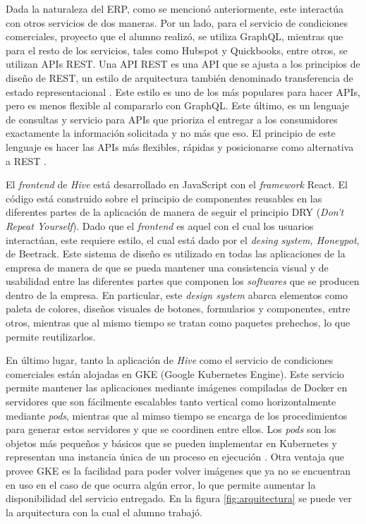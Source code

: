    Dada la naturaleza del ERP, como se mencionó anteriormente, este interactúa con otros servicios de dos maneras. Por un lado, para el servicio de condiciones comerciales, proyecto que el alumno realizó, se utiliza GraphQL, mientras que para el resto de los servicios, tales como Hubspot y Quickbooks, entre otros, se utilizan APIs REST. Una API REST es una API que se ajusta a los principios de diseño de REST, un estilo de arquitectura también denominado transferencia de estado representacional \cite{ibm_api_rest}. Este estilo es uno de los más populares para hacer APIs, pero es menos flexible al compararlo con GraphQL. Este último, es un lenguaje de consultas y servicio para APIs que prioriza el entregar a los consumidores exactamente la información solicitada y no más que eso. El principio de este lenguaje es hacer las APIs más flexibles, rápidas y posicionarse como alternativa a REST \cite{def_graphql}.
   
   El \textit{frontend} de \textit{Hive} está desarrollado en JavaScript con el \textit{framework} React. El código está construido sobre el principio de componentes reusables en las diferentes partes de la aplicación de manera de seguir el principio DRY (\textit{Don't Repeat Yourself}). Dado que el \textit{frontend} es aquel con el cual los usuarios interactúan, este requiere estilo, el cual está dado por el \textit{desing system, Honeypot}, de Beetrack. Este sistema de diseño es utilizado en todas las aplicaciones de la empresa de manera de que se pueda mantener una consistencia visual y de usabilidad entre las diferentes partes que componen los \textit{softwares} que se producen dentro de la empresa. En particular, este \textit{design system} abarca elementos como paleta de colores, diseños visuales de botones, formularios y componentes, entre otros, mientras que al mismo tiempo se tratan como paquetes prehechos, lo que permite reutilizarlos.
   
   En último lugar, tanto la aplicación de \textit{Hive} como el servicio de condiciones comerciales están alojadas en GKE (Google Kubernetes Engine). Este servicio permite mantener las aplicaciones mediante imágenes compiladas de Docker en servidores que son fácilmente escalables tanto vertical como horizontalmente mediante \textit{pods}, mientras que al mimso tiempo se encarga de los procedimientos para generar estos servidores y que se coordinen entre ellos. Los \textit{pods} son los objetos más pequeños y básicos que se pueden implementar en Kubernetes y representan una instancia única de un proceso en ejecución \cite{gke_pods}. Otra ventaja que provee GKE es la facilidad para poder volver imágenes que ya no se encuentran en uso en el caso de que ocurra algún error, lo que permite aumentar la disponibilidad del servicio entregado. En la figura \ref{fig:arquitectura} se puede ver la arquitectura con la cual el alumno trabajó.

